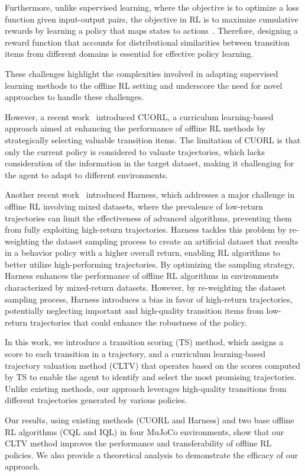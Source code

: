 Furthermore, unlike supervised learning, where the objective is to optimize a loss function given input-output pairs, the objective in RL is to maximize cumulative rewards by learning a policy that maps states to actions~\citep{sutton2018reinforcement}. Therefore, designing a reward function that accounts for distributional similarities between transition items from different domains is essential for effective policy learning.

These challenges highlight the complexities involved in adapting supervised learning methods to the offline RL setting and underscore the need for novel approaches to handle these challenges.


However, a recent work~\citep{cai2023curriculum} introduced CUORL, a curriculum learning-based approach aimed at enhancing the performance of offline RL methods by strategically selecting valuable transition items. The limitation of CUORL is that only the current policy is considered to valuate trajectories, which lacks consideration of the information in the target dataset, making it challenging for the agent to adapt to different environments. 

Another recent work~\citep{hong2023harnessing} introduced Harness, which addresses a major challenge in offline RL involving mixed datasets, where the prevalence of low-return trajectories can limit the effectiveness of advanced algorithms, preventing them from fully exploiting high-return trajectories. Harness tackles this problem by re-weighting the dataset sampling process to create an artificial dataset that results in a behavior policy with a higher overall return, enabling RL algorithms to better utilize high-performing trajectories. By optimizing the sampling strategy, Harness enhances the performance of offline RL algorithms in environments characterized by mixed-return datasets. However, by re-weighting the dataset sampling process, Harness introduces a bias in favor of high-return trajectories, potentially neglecting important and high-quality transition items from low-return trajectories that could enhance the robustness of the policy.




In this work, we introduce a transition scoring (TS) method, which assigns a score to each transition in a trajectory, and a curriculum learning-based trajectory valuation method (CLTV) that operates based on the scores computed by TS to enable the agent to identify and select the most promising trajectories. Unlike existing methods, our approach leverages high-quality transitions from different trajectories generated by various policies. 

Our results, using existing methods (CUORL and Harness) and two base offline RL algorithms (CQL and IQL) in four MuJoCo environments, show that our CLTV method improves the performance and transferability of offline RL policies. We also provide a theoretical analysis to demonstrate the efficacy of our approach.

